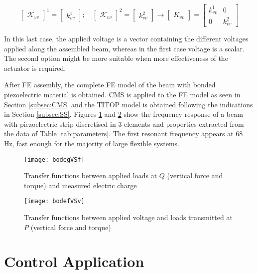 \documentclass{ifacconf}
\begin{document}
\begin{equation}
\begin{bmatrix}
\mathcal{K}_{vv}
\end{bmatrix}^1 = \begin{bmatrix}
k^1_{vv} 
\end{bmatrix}; \quad \begin{bmatrix}
\mathcal{K}_{vv}
\end{bmatrix}^2 = \begin{bmatrix}
k^2_{vv} 
\end{bmatrix} \rightarrow \begin{bmatrix}
K_{vv}
\end{bmatrix} = \begin{bmatrix}
k^1_{vv} &  0  \\ 0 & k^2_{vv} 
\end{bmatrix}
\end{equation}

In this last case, the applied voltage is a vector containing the different voltages applied along the assembled beam, whereas in the first case voltage is a scalar. The second option might be more suitable when more effectiveness of the actuator is required.

After FE assembly, the complete FE model of the beam with bonded piezoelectric material is obtained. CMS is applied to the FE model as seen in Section \ref{subsec:CMS} and the TITOP model is obtained following the indications in Section \ref{subsec:SS}.  Figures \ref{fig:gVSv} and \ref{fig:gVSm} show the frequency response of a beam with piezoelectric strip discretised in 3 elements and properties extracted from the data of Table \ref{tab:parameters}. The first resonant frequency appears at 68 Hz, fast enough for the majority of large flexible systems. 

\begin{figure} 
\center
\texttt{[image: bodegVSf]}
\caption{Transfer functions between applied loads at $Q$ (vertical force and torque) and measured electric charge}
\label{fig:gVSv}
\end{figure}

\begin{figure} 
\center
\texttt{[image: bodefVSv]}
\caption{Transfer functions between applied voltage and loads transmitted at $P$ (vertical force and torque)}
\label{fig:gVSm}
\end{figure}




\section{Control Application}
\label{sec:control}
\end{document}
